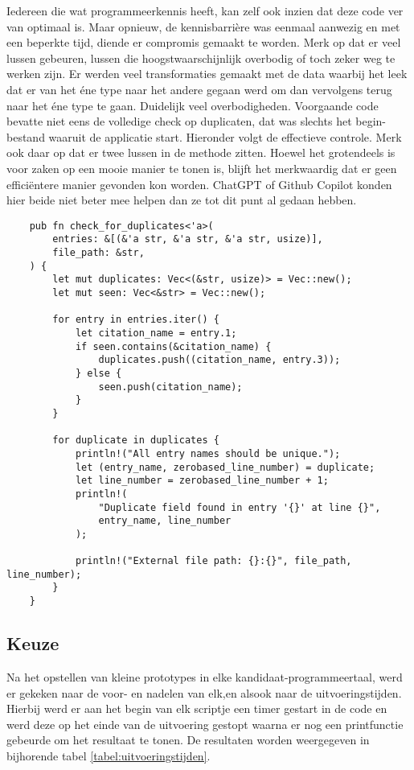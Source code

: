 Iedereen die wat programmeerkennis heeft, kan zelf ook inzien dat deze code ver van optimaal is. Maar opnieuw, de kennisbarrière was eenmaal aanwezig en met een beperkte tijd, diende er compromis gemaakt te worden. Merk op dat er veel lussen gebeuren, lussen die hoogstwaarschijnlijk overbodig of toch zeker weg te werken zijn. Er werden veel transformaties gemaakt met de data waarbij het leek dat er van het éne type naar het andere gegaan werd om dan vervolgens terug naar het éne type te gaan. Duidelijk veel overbodigheden. Voorgaande code bevatte niet eens de volledige check op duplicaten, dat was slechts het begin-bestand waaruit de applicatie start. Hieronder volgt de effectieve controle. Merk ook daar op dat er twee lussen in de methode zitten. Hoewel het grotendeels is voor zaken op een mooie manier te tonen is, blijft het merkwaardig dat er geen efficiëntere manier gevonden kon worden. ChatGPT of Github Copilot konden hier beide niet beter mee helpen dan ze tot dit punt al gedaan hebben.

\begin{verbatim}
    pub fn check_for_duplicates<'a>(
        entries: &[(&'a str, &'a str, &'a str, usize)],
        file_path: &str,
    ) {
        let mut duplicates: Vec<(&str, usize)> = Vec::new();
        let mut seen: Vec<&str> = Vec::new();

        for entry in entries.iter() {
            let citation_name = entry.1;
            if seen.contains(&citation_name) {
                duplicates.push((citation_name, entry.3));
            } else {
                seen.push(citation_name);
            }
        }

        for duplicate in duplicates {
            println!("All entry names should be unique.");
            let (entry_name, zerobased_line_number) = duplicate;
            let line_number = zerobased_line_number + 1;
            println!(
                "Duplicate field found in entry '{}' at line {}",
                entry_name, line_number
            );

            println!("External file path: {}:{}", file_path, line_number);
        }
    }
\end{verbatim}
\pagebreak  
 
\subsection{Keuze}
Na het opstellen van kleine prototypes in elke kandidaat-programmeertaal, werd er gekeken naar de voor- en nadelen van elk,en alsook naar de uitvoeringstijden. Hierbij werd er aan het begin van elk scriptje een timer gestart in de code en werd deze op het einde van de uitvoering gestopt waarna er nog een printfunctie gebeurde om het resultaat te tonen. De resultaten worden weergegeven in bijhorende tabel \ref{tabel:uitvoeringstijden}.

